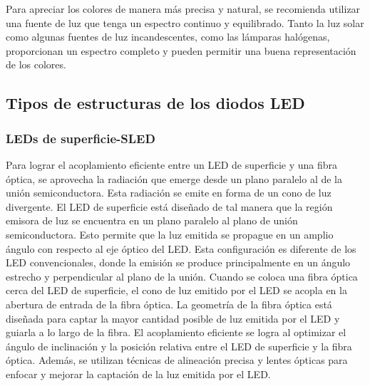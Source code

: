 \documentclass[
	12pt, %
	fleqn, %
	a4paper, %
	oneside, %
]{LegrandOrangeBook}
\begin{document}
\begin{notation}
Para apreciar los colores de manera más precisa y natural, se recomienda utilizar una fuente de luz que tenga un espectro continuo y equilibrado. Tanto la luz solar como algunas fuentes de luz incandescentes, como las lámparas halógenas, proporcionan un espectro completo y pueden permitir una buena representación de los colores.
\end{notation}
\subsection{Tipos de estructuras de los diodos LED}
\subsubsection{LEDs de superficie-SLED}
Para lograr el acoplamiento eficiente entre un LED de superficie y una fibra óptica, se aprovecha la radiación que emerge desde un plano paralelo al de la unión semiconductora. Esta radiación se emite en forma de un cono de luz divergente. El LED de superficie está diseñado de tal manera que la región emisora de luz se encuentra en un plano paralelo al plano de unión semiconductora. Esto permite que la luz emitida se propague en un amplio ángulo con respecto al eje óptico del LED. Esta configuración es diferente de los LED convencionales, donde la emisión se produce principalmente en un ángulo estrecho y perpendicular al plano de la unión. Cuando se coloca una fibra óptica cerca del LED de superficie, el cono de luz emitido por el LED se acopla en la abertura de entrada de la fibra óptica. La geometría de la fibra óptica está diseñada para captar la mayor cantidad posible de luz emitida por el LED y guiarla a lo largo de la fibra. El acoplamiento eficiente se logra al optimizar el ángulo de inclinación y la posición relativa entre el LED de superficie y la fibra óptica. Además, se utilizan técnicas de alineación precisa y lentes ópticas para enfocar y mejorar la captación de la luz emitida por el LED.
\end{document}
